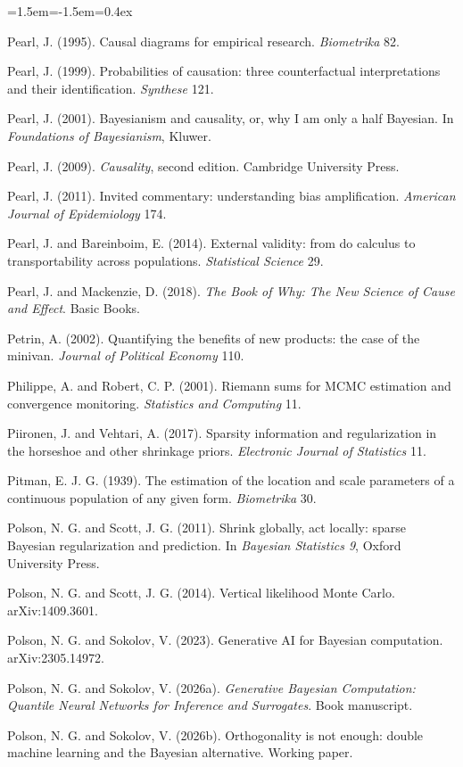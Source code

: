 \begin{list}{}{\leftmargin=1.5em\itemindent=-1.5em\itemsep=0.4ex}
\item Pearl, J. (1995). Causal diagrams for empirical research. \emph{Biometrika} 82.
\item Pearl, J. (1999). Probabilities of causation: three counterfactual interpretations and their identification. \emph{Synthese} 121.
\item Pearl, J. (2001). Bayesianism and causality, or, why I am only a half Bayesian. In \emph{Foundations of Bayesianism}, Kluwer.
\item Pearl, J. (2009). \emph{Causality}, second edition. Cambridge University Press.
\item Pearl, J. (2011). Invited commentary: understanding bias amplification. \emph{American Journal of Epidemiology} 174.
\item Pearl, J. and Bareinboim, E. (2014). External validity: from do calculus to transportability across populations. \emph{Statistical Science} 29.
\item Pearl, J. and Mackenzie, D. (2018). \emph{The Book of Why: The New Science of Cause and Effect}. Basic Books.
\item Petrin, A. (2002). Quantifying the benefits of new products: the case of the minivan. \emph{Journal of Political Economy} 110.
\item Philippe, A. and Robert, C. P. (2001). Riemann sums for MCMC estimation and convergence monitoring. \emph{Statistics and Computing} 11.
\item Piironen, J. and Vehtari, A. (2017). Sparsity information and regularization in the horseshoe and other shrinkage priors. \emph{Electronic Journal of Statistics} 11.
\item Pitman, E. J. G. (1939). The estimation of the location and scale parameters of a continuous population of any given form. \emph{Biometrika} 30.
\item Polson, N. G. and Scott, J. G. (2011). Shrink globally, act locally: sparse Bayesian regularization and prediction. In \emph{Bayesian Statistics 9}, Oxford University Press.
\item Polson, N. G. and Scott, J. G. (2014). Vertical likelihood Monte Carlo. arXiv:1409.3601.
\item Polson, N. G. and Sokolov, V. (2023). Generative AI for Bayesian computation. arXiv:2305.14972.
\item Polson, N. G. and Sokolov, V. (2026a). \emph{Generative Bayesian Computation: Quantile Neural Networks for Inference and Surrogates}. Book manuscript.
\item Polson, N. G. and Sokolov, V. (2026b). Orthogonality is not enough: double machine learning and the Bayesian alternative. Working paper.

\end{list}
